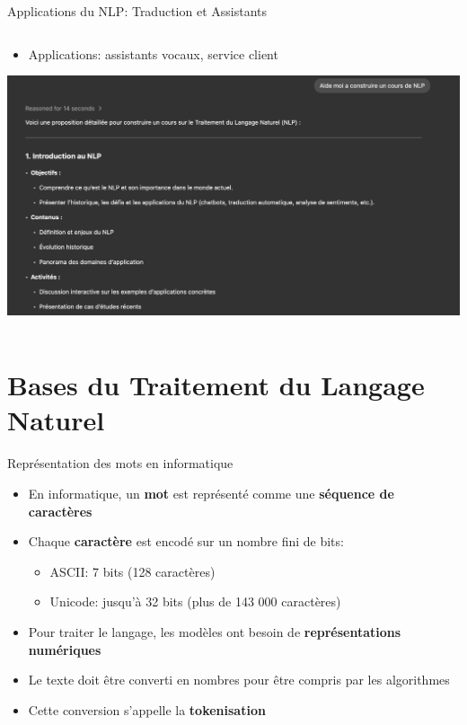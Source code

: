 \documentclass[aspectratio=169,11pt]{beamer}
\begin{document}
\begin{frame}{Applications du NLP: Traduction et Assistants}
\begin{columns}
\begin{column}{0.5\textwidth}
\begin{itemize}
                \item Applications: assistants vocaux, service client
            \end{itemize}
            \vspace{0.3cm}
            \includegraphics[width=\textwidth]{images/chatbot.png}
        \end{column}
    \end{columns}
\end{frame}

\section{Bases du Traitement du Langage Naturel}

\begin{frame}{Représentation des mots en informatique}
    \begin{itemize}
        \item En informatique, un \textbf{mot} est représenté comme une \textbf{séquence de caractères}
        \item Chaque \textbf{caractère} est encodé sur un nombre fini de bits:
        \begin{itemize}
            \item ASCII: 7 bits (128 caractères)
            \item Unicode: jusqu'à 32 bits (plus de 143 000 caractères)
        \end{itemize}
        \vspace{0.3cm}
        \item Pour traiter le langage, les modèles ont besoin de \textbf{représentations numériques}
        \item Le texte doit être converti en nombres pour être compris par les algorithmes
        \item Cette conversion s'appelle la \textbf{tokenisation}
    \end{itemize}
\end{frame}
\end{document}
